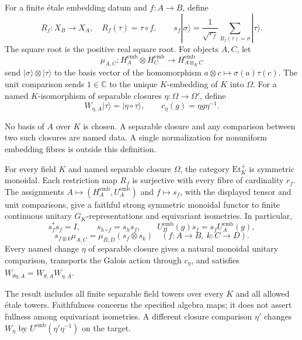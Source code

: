 \begin{definition}
For a finite \'etale embedding datum and $f:A\to B$, define
\[
 R_f:X_B\longrightarrow X_A,\quad R_f(\tau)=\tau\circ f,
 \qquad
 s_f|\sigma\rangle=\frac{1}{\sqrt{r_f}}
       \sum_{R_f(\tau)=\sigma}|\tau\rangle.
\]
The square root is the positive real square root. For objects $A,C$, let
\[
 \mu_{A,C}:H_A^{\mathrm{emb}}\otimes H_C^{\mathrm{emb}}
       \longrightarrow H_{A\otimes_K C}^{\mathrm{emb}}
\]
send $|\sigma\rangle\otimes|\tau\rangle$ to the basis vector of the
homomorphism $a\otimes c\mapsto\sigma(a)\tau(c)$. The unit comparison
sends $1\in\mathbb C$ to the unique $K$-embedding of $K$ into $\Omega$.
For a named $K$-isomorphism of separable closures
$\eta:\Omega\to\Omega'$, define
\[
 W_{\eta,A}|\tau\rangle=|\eta\circ\tau\rangle,
 \qquad c_\eta(g)=\eta g\eta^{-1}.
\]
\end{definition}
\begin{scope}
No basis of $A$ over $K$ is chosen. A separable closure and any comparison
between two such closures are named data. A single normalization for
nonuniform embedding fibres is outside this definition.
\end{scope}

\begin{theorem}
\statusProved\quad
For every field $K$ and named separable closure $\Omega$, the category
$\mathrm{Et}_K^+$ is symmetric monoidal. Each restriction map $R_f$ is
surjective with every fibre of cardinality $r_f$. The assignments
$A\mapsto(H_A^{\mathrm{emb}},U_A^{\mathrm{emb}})$ and $f\mapsto s_f$,
with the displayed tensor and unit comparisons, give a faithful strong
symmetric monoidal functor to finite continuous unitary
$G_K$-representations and equivariant isometries. In particular,
\[
 s_f^*s_f=I,\qquad s_{h\circ f}=s_hs_f,\qquad
 U_B^{\mathrm{emb}}(g)s_f=s_fU_A^{\mathrm{emb}}(g),
\]
\[
 s_{f\otimes k}\mu_{A,C}=\mu_{B,D}(s_f\otimes s_k)
       \quad(f:A\to B,\ k:C\to D).
\]
Every named change $\eta$ of separable closure gives a natural monoidal
unitary comparison, transports the Galois action through $c_\eta$, and
satisfies $W_{\theta\eta,A}=W_{\theta,A}W_{\eta,A}$.
\end{theorem}
\begin{scope}
The result includes all finite separable field towers over every $K$ and
all allowed \'etale towers. Faithfulness concerns the specified algebra
maps; it does not assert fullness among equivariant isometries. A different
closure comparison $\eta'$ changes $W_\eta$ by
$U^{\mathrm{emb}}(\eta'\eta^{-1})$ on the target.
\end{scope}

